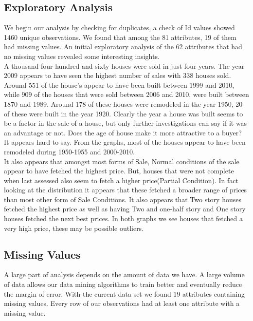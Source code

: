 \documentclass[fleqn,10pt]{SelfArx} %
\begin{document}
	\subsection{Exploratory Analysis}
	We begin our analysis by checking for duplicates, a check of Id values showed 1460 unique observations. We found that among the 81 attributes, 19 of them had missing values. An initial exploratory analysis of the 62 attributes that had no missing values revealed some interesting insights. \\
	
	A thousand four hundred and sixty houses were sold in just four years. The year 2009 appears to have seen the highest number of sales with 338 houses sold. Around 551 of the house's appear to have been built between 1999 and 2010, while 909 of the houses that were sold between 2006 and 2010,  were built between 1870 and 1989. Around 178 of these houses were remodeled in the year 1950, 20 of these were built in the year 1920. Clearly the year a house was built seems to be a factor in the sale of a house, but only further investigations can say if it was an advantage or not. Does the age of house make it more attractive to a buyer? It appears hard to say. From the graphs, most of the houses appear to have been remodeled during 1950-1955 and 2000-2010. \\
	
	It also appears that amongst most forms of Sale, Normal conditions of the sale appear to have fetched the highest price. But, houses that were not complete when last assessed also seem to fetch a higher price(Partial Condition). In fact looking at the distribution it appears that these fetched a broader range of prices than most other form of Sale Conditions. It also appears that Two story houses fetched the highest price as well as having Two and one-half story and One story houses fetched the next best prices. In both graphs we see houses that fetched a very high price, these may be possible outliers. 
	
	\subsection{Missing Values}
	A large part of analysis depends on the amount of data we have. A large volume of data allows our  data mining algorithms to train better and eventually reduce the margin of error. With the current data set we found 19 attributes containing missing values. Every row of our observations had at least one attribute with a missing value. 
	
\end{document}
